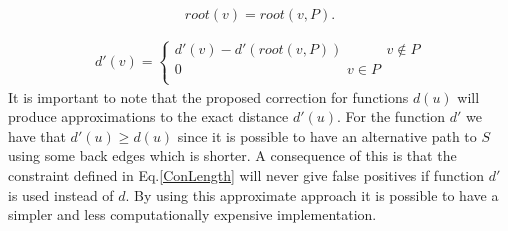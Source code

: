 \begin{equation}
root(v) =   root(v,P).
\end{equation}


\begin{eqnarray}
d'(v) =   \left\{ \begin{array}{l}
 d'(v)- d'(root(v, P))\,\,\,\,\,\,\,\,\,\,\,\,\,\,\,\,\,\,\, v \notin P\\
 0\,\,\,\,\,\,\,\,\,\,\,\,\,\,\,\,\,\,\,\,\,\,\,\,\,\,\,\,\,\,\,\,\,\,\,\,\,\,\,\,\,\,\,\,\,\,\,\,\,\,\,\,\,\,\,\,\,\,\,\,\,\,\,\,\,\,\,\,\,\,\, v \in P\\
 \end{array} \right.
\end{eqnarray}
It is important to note that the proposed correction for functions $d(u)$ will produce approximations to the exact 
distance $d'(u)$. For the function $d'$ we have that  $d'(u)\geq d(u)$ since it is possible to have an alternative path to $S$ using some back edges which is shorter. A consequence of this is that the constraint defined in  Eq.\eqref{ConLength} will never give false positives if function $d'$ is used instead of $d$. By using this approximate approach it is possible to have a simpler and less computationally expensive implementation. 

